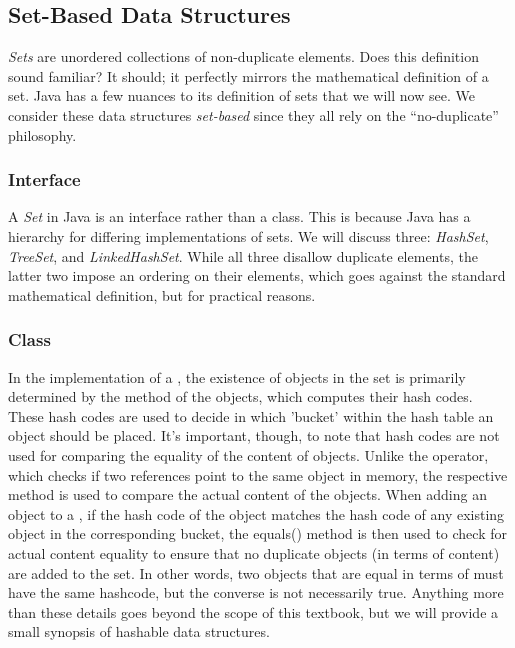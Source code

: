 \subsection*{Set-Based Data Structures}
\textit{Sets} are unordered collections of non-duplicate elements. Does this definition sound familiar? It should; it perfectly mirrors the mathematical definition of a set. Java has a few nuances to its definition of sets that we will now see. We consider these data structures \textit{set-based} since they all rely on the ``no-duplicate'' philosophy.

\subsubsection*{ Interface}
A \textit{Set} in Java is an interface rather than a class. This is because Java has a hierarchy for differing implementations of sets. We will discuss three: \textit{HashSet}, \textit{TreeSet}, and \textit{LinkedHashSet}. While all three disallow duplicate elements, the latter two impose an ordering on their elements, which goes against the standard mathematical definition, but for practical reasons.

\subsubsection*{ Class}
In the implementation of a , the existence of objects in the set is primarily determined by the  method of the objects, which computes their hash codes. These hash codes are used to decide in which 'bucket' within the hash table an object should be placed. It's important, though, to note that hash codes are not used for comparing the equality of the content of objects. Unlike the \ttt{==} operator, which checks if two references point to the same object in memory, the respective  method is used to compare the actual content of the objects. When adding an object to a , if the hash code of the object matches the hash code of any existing object in the corresponding bucket, the equals() method is then used to check for actual content equality to ensure that no duplicate objects (in terms of content) are added to the set. In other words, two objects that are equal in terms of  must have the same hashcode, but the converse is not necessarily true. Anything more than these details goes beyond the scope of this textbook, but we will provide a small synopsis of hashable data structures.


